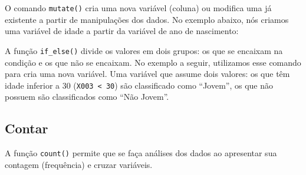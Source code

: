 \documentclass[
  10pt,
  brazil,
  a4paper,
  twoside, notitlepage, openright]{book}
\newenvironment{Shaded}{\begin{snugshade}}{\end{snugshade}}
\newcommand{\CommentTok}[1]{\textcolor[rgb]{0.56,0.35,0.01}{\textit{#1}}}
\newcommand{\DataTypeTok}[1]{\textcolor[rgb]{0.13,0.29,0.53}{#1}}
\newcommand{\DecValTok}[1]{\textcolor[rgb]{0.00,0.00,0.81}{#1}}
\newcommand{\KeywordTok}[1]{\textcolor[rgb]{0.13,0.29,0.53}{\textbf{#1}}}
\newcommand{\NormalTok}[1]{#1}
\newcommand{\OperatorTok}[1]{\textcolor[rgb]{0.81,0.36,0.00}{\textbf{#1}}}
\newcommand{\StringTok}[1]{\textcolor[rgb]{0.31,0.60,0.02}{#1}}
\begin{document}
O comando \texttt{mutate()} cria uma nova variável (coluna) ou modifica uma já existente a partir de manipulações dos dados. No exemplo abaixo, nós criamos uma variável de idade a partir da variável de ano de nascimento:

\begin{Shaded}
\end{Shaded}

A função \texttt{if\_else()} divide os valores em dois grupos: os que se encaixam na condição e os que não se encaixam. No exemplo a seguir, utilizamos esse comando para cria uma nova variável. Uma variável que assume dois valores: os que têm idade inferior a 30 (\texttt{X003\ \textless{}\ 30}) são classificado como ``Jovem'', os que não possuem são classificados como ``Não Jovem''.

\begin{Shaded}
\end{Shaded}

\hypertarget{contar}{%
\subsection{Contar}\label{contar}}

A função \texttt{count()} permite que se faça análises dos dados ao apresentar sua contagem (frequência) e cruzar variáveis.
\end{document}
